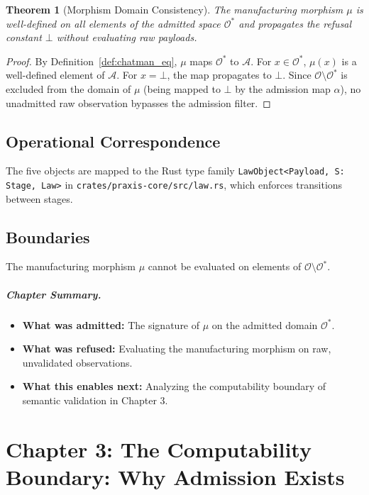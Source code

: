 \documentclass[11pt,oneside]{book}
\theoremstyle{definition}
\theoremstyle{plain}
\newtheorem{theorem}{Theorem}[chapter]
\theoremstyle{remark}
\newcommand{\Obs}{\mathcal{O}}                 %
\newcommand{\Act}{\mathcal{A}}                 %
\newcommand{\muop}{\mu}                        %
\newcommand{\adm}{\alpha}                      %
\newcommand{\Rfsl}{\bot}                        %
\newcommand{\code}[1]{\texttt{#1}}
\begin{document}
\begin{theorem}[Morphism Domain Consistency]\label{thm:mu_domain}
The manufacturing morphism $\muop$ is well-defined on all elements of the admitted space $\Obs^*$ and propagates the refusal constant $\Rfsl$ without evaluating raw payloads. %
\end{theorem}

\begin{proof}
By Definition~\ref{def:chatman_eq}, $\muop$ maps $\Obs^*$ to $\Act$. %
For $x \in \Obs^*$, $\muop(x)$ is a well-defined element of $\Act$. %
For $x = \Rfsl$, the map propagates to $\Rfsl$. %
Since $\Obs \setminus \Obs^*$ is excluded from the domain of $\muop$ (being mapped to $\Rfsl$ by the admission map $\adm$), no unadmitted raw observation bypasses the admission filter. %
\end{proof}

\section{Operational Correspondence}
The five objects are mapped to the Rust type family \code{LawObject<Payload, S: Stage, Law>} in \code{crates/praxis-core/src/law.rs}, which enforces transitions between stages. %

\section{Boundaries}
The manufacturing morphism $\muop$ cannot be evaluated on elements of $\Obs \setminus \Obs^*$. %

\paragraph{Chapter Summary.}
\begin{itemize}
  \item \textbf{What was admitted:} The signature of $\muop$ on the admitted domain $\Obs^*$. %
  \item \textbf{What was refused:} Evaluating the manufacturing morphism on raw, unvalidated observations. %
  \item \textbf{What this enables next:} Analyzing the computability boundary of semantic validation in Chapter 3. %
\end{itemize}

\chapter{Chapter 3: The Computability Boundary: Why Admission Exists}
\label{ch:computability}
\end{document}
